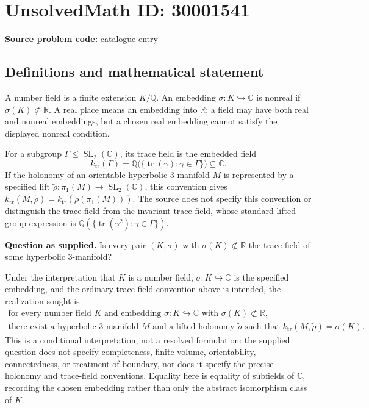 \documentclass[11pt]{article}
\newcommand{\Q}{\mathbb{Q}}
\newcommand{\R}{\mathbb{R}}
\newcommand{\C}{\mathbb{C}}
\begin{document}
\section*{UnsolvedMath ID: 30001541}
\textbf{Source problem code:} catalogue entry
\subsection{Definitions and mathematical statement}
A number field is a finite extension \(K/\Q\). An embedding \(\sigma:K\hookrightarrow\C\) is nonreal if \(\sigma(K)\not\subset\R\). A real place means an embedding into \(\R\); a field may have both real and nonreal embeddings, but a chosen real embedding cannot satisfy the displayed nonreal condition.

For a subgroup \(\Gamma\leq\operatorname{SL}_2(\C)\), its trace field is the embedded field
\[
 k_{\mathrm{tr}}(\Gamma)=\Q\bigl(\{\operatorname{tr}(\gamma):\gamma\in\Gamma\}\bigr)\subseteq\C.
\]
If the holonomy of an orientable hyperbolic \(3\)-manifold \(M\) is represented by a specified lift \(\widetilde\rho:\pi_1(M)\to\operatorname{SL}_2(\C)\), this convention gives \(k_{\mathrm{tr}}(M,\widetilde\rho)=k_{\mathrm{tr}}(\widetilde\rho(\pi_1(M)))\). The source does not specify this convention or distinguish the trace field from the invariant trace field, whose standard lifted-group expression is \(\Q(\{\operatorname{tr}(\gamma^2):\gamma\in\Gamma\})\).

\textbf{Question as supplied.} Is every pair \((K,\sigma)\) with \(\sigma(K)\not\subset\R\) the trace field of some hyperbolic \(3\)-manifold?

Under the interpretation that \(K\) is a number field, \(\sigma:K\hookrightarrow\C\) is the specified embedding, and the ordinary trace-field convention above is intended, the realization sought is
\[
\begin{gathered}
\text{for every number field }K\text{ and embedding }\sigma:K\hookrightarrow\C
\text{ with }\sigma(K)\not\subset\R,\\
\text{there exist a hyperbolic }3\text{-manifold }M
\text{ and a lifted holonomy }\widetilde\rho
\text{ such that }k_{\mathrm{tr}}(M,\widetilde\rho)=\sigma(K).
\end{gathered}
\]
This is a conditional interpretation, not a resolved formulation: the supplied question does not specify completeness, finite volume, orientability, connectedness, or treatment of boundary, nor does it specify the precise holonomy and trace-field conventions. Equality here is equality of subfields of \(\C\), recording the chosen embedding rather than only the abstract isomorphism class of \(K\).
\end{document}
